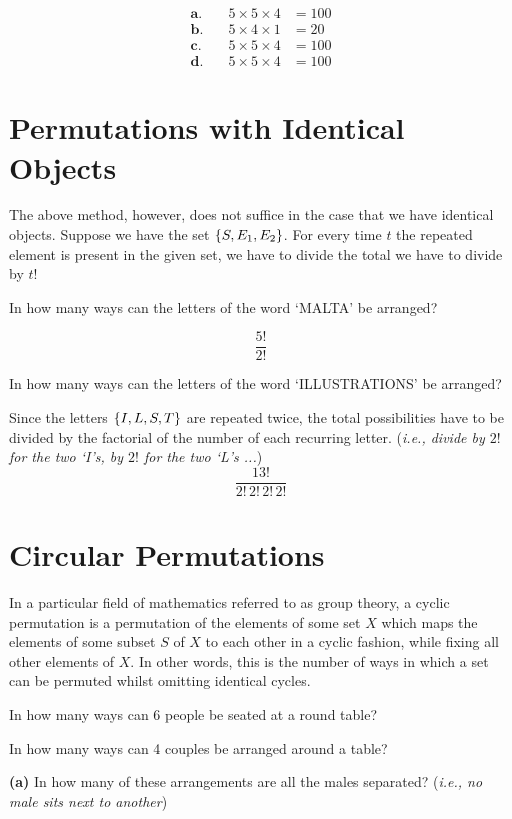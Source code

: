 	\begin{align*}
	{\textbf{a.}} \quad & 5\times5\times4 & = 100 \\
	{\textbf{b.}} \quad & 5\times4\times1 & = 20  \\
	{\textbf{c.}} \quad & 5\times5\times4 & = 100 \\
	{\textbf{d.}} \quad & 5\times5\times4 & = 100 
	\end{align*}
	\section{Permutations with Identical Objects}
	The above method, however, does not suffice in the case that we have identical objects. Suppose we have the set $\set{S,E_1,E_2}$. For every time $t$ the repeated element is present in the given set, we have to divide the total we have to divide by $t!$
	\begin{example}
		In how many ways can the letters of the word `MALTA' be arranged?
	\end{example}
	\[\frac{5!}{2!}\]
	
	\begin{example}
		In how many ways can the letters of the word `ILLUSTRATIONS' be arranged?
	\end{example}
Since the letters $\set{I,L,S,T}$ are repeated twice, the total possibilities have to be divided by the factorial of the number of each recurring letter. (\textit{i.e., divide by $2!$ for the two `I's, by $2!$ for the two `L's ...})
	\[\frac{13!}{2!\,2!\,2!\,2!}\]
	\section{Circular Permutations}
	In a particular field of mathematics referred to as group theory, a cyclic permutation is a permutation of the elements of some set $X$ which maps the elements of some subset $S$ of $X$ to each other in a cyclic fashion, while fixing all other elements of $X$. In other words, this is the number of ways in which a set can be permuted whilst omitting identical cycles.
	\begin{example}
		In how many ways can 6 people be seated at a round table?
	\end{example}

\begin{example}
	In how many ways can 4 couples be arranged around a table?
	
	\quad\textbf{(a)} In  how many of these arrangements are all the males separated? (\textit{i.e., no male sits next to another})
	
	
\end{example}
